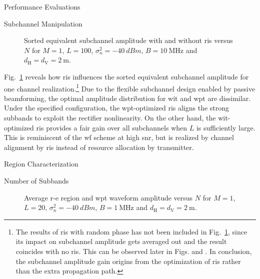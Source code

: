 \begin{section}{Performance Evaluations}
	\begin{subsection}{Subchannel Manipulation}
		\begin{figure}[H]
			\centering
			\resizebox{0.8\columnwidth}{!}{
				
			}
			\caption{Sorted equivalent subchannel amplitude with and without \gls{ris} versus $N$ for $M=1$, $L=100$, $\sigma_n^2=\qty{-40}{dBm}$, $B=\qty{10}{\MHz}$ and $d_{\mathrm{H}}=d_{\mathrm{V}}=\qty{2}{\meter}$.}
			\label{fg:channel_amplitude}
		\end{figure}

		Fig.~\ref{fg:channel_amplitude} reveals how \gls{ris} influences the sorted equivalent subchannel amplitude for one channel realization.\footnote{The results of \gls{ris} with random phase has not been included in Fig.~\ref{fg:channel_amplitude}, since its impact on subchannel amplitude gets averaged out and the result coincides with no \gls{ris}. This can be observed later in Figs.  and . In conclusion, the subchannel amplitude gain origins from the optimization of \gls{ris} rather than the extra propagation path.} Due to the flexible subchannel design enabled by passive beamforming, the optimal amplitude distribution for \gls{wit} and \gls{wpt} are dissimilar. Under the specified configuration, the \gls{wpt}-optimized \gls{ris} aligns the strong subbands to exploit the rectifier nonlinearity. On the other hand, the \gls{wit}-optimized \gls{ris} provides a fair gain over all subchannels when $L$ is sufficiently large. This is reminiscent of the \gls{wf} scheme at high \gls{snr}, but is realized by channel alignment by \gls{ris} instead of resource allocation by transmitter.
	\end{subsection}

	\begin{subsection}{ Region Characterization}
		\begin{subsubsection}{Number of Subbands}
			\begin{figure}[H]
				\centering
				\caption{Average \gls{r-e} region and \gls{wpt} waveform amplitude versus $N$ for $M=1$, $L=20$, $\sigma_n^2=\qty{-40}{dBm}$, $B=\qty{1}{\MHz}$ and $d_{\mathrm{H}}=d_{\mathrm{V}}=\qty{2}{\meter}$.}
			\end{figure}


\end{subsubsection}
\end{subsection}
\end{section}
